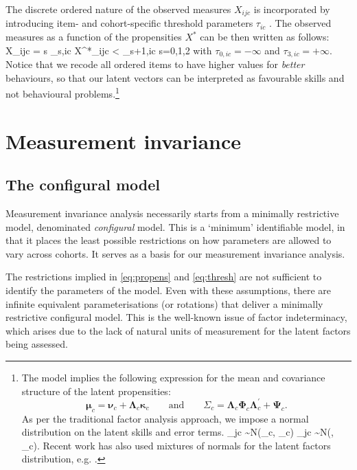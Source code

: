 The discrete ordered nature of the observed measures $X_{ijc}$ is incorporated by introducing item- and cohort-specific threshold parameters $\tau_{ic}$ \citep{Muthen1984}. The observed measures as a function of the propensities $X^*$ can be then written as follows:
\be\label{eq:thresh}
X_{ijc} = s \qquad {} \; \tau_{s,ic} \leq X^*_{ijc} < \tau_{s+1,ic} \qquad {} \; s=0,1,2
\ee
with $\tau_{0,ic}=-\infty$ and $\tau_{3,ic}=+\infty$. Notice that we recode all ordered items to have higher values for \emph{better} behaviours, so that our latent vectors can be interpreted as favourable skills and not behavioural problems.\footnote{The model implies the following expression for the mean and covariance structure of the latent propensities:
$$\bm{\mu}_c=\bm{\nu}_c + \bm{\Lambda}_c\bm{\kappa}_c \qquad \text{and} \qquad \Sigma_c = \bm{\Lambda}_c \bm{\Phi}_c \bm{\Lambda}_c^\prime + \bm{\Psi}_c.$$
As per the traditional factor analysis approach, we impose a normal distribution on the latent skills and error terms. 
\be\label{eq:norm}
\bm{\theta}_{jc} \sim N(\bm{\kappa}_c, \bm{\Phi}_c) \qquad {} \qquad {}_{jc} \sim N(, \bm{\Psi}_c).
\ee
Recent work has also used mixtures of normals for the latent factors distribution, e.g. \citet{Conti2010a}.}

\section{Measurement invariance \label{sec:measinv}}

\subsection{The configural model \label{sec:config}}

Measurement invariance analysis necessarily starts from a minimally restrictive model, denominated \emph{configural} model. This is a `minimum' identifiable model, in that it places the least possible restrictions on how parameters are allowed to vary across cohorts. It serves as a basis for our measurement invariance analysis.

The restrictions implied in \eqref{eq:propens} and \eqref{eq:thresh} are not sufficient to identify the parameters of the model. Even with these assumptions, there are infinite equivalent parameterisations (or rotations) that deliver a minimally restrictive configural model. This is the well-known issue of factor indeterminacy, which arises due to the lack of natural units of measurement for the latent factors being assessed.

